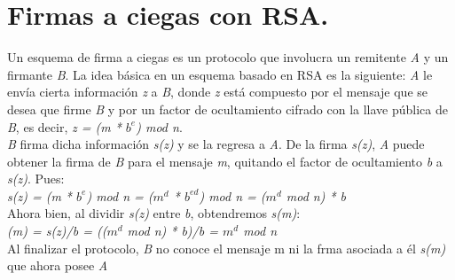 
\section{Firmas a ciegas con RSA. }

Un esquema de firma a ciegas es un protocolo que involucra un remitente \textit{A} y un firmante \textit{B}. La idea básica en un esquema basado en RSA es la siguiente: \textit{A} le envía cierta información \textit{z} a \textit{B}, donde \textit{z} está compuesto por el mensaje que se desea que firme \textit{B} y por un factor de ocultamiento cifrado con la llave pública de \textit{B}, es decir, \textit{z = (m *  $b^{e}$) mod n}.  \\
\textit{B} firma dicha información \textit{s(z)} y se la regresa a \textit{A}. De la firma \textit{s(z)}, \textit{A} puede obtener la firma de \textit{B} para el mensaje \textit{m}, quitando el factor de ocultamiento \textit{b} a \textit{s(z)}. Pues: \\

\textit{s(z) = (m *  $b^{e}$) mod n = ($m^{d}$ *  $b^{ed}$) mod n = ($m^{d}$ mod n) * b} \\

Ahora bien, al dividir \textit{s(z)} entre \textit{b}, obtendremos \textit{s(m)}: \\

\textit{(m) = s(z)/b = (($m^{d}$ mod n) * b)/b = $m^{d}$ mod n} \\

Al finalizar el protocolo, \textit{B} no conoce el mensaje m ni la frma asociada a él \textit{s(m)} que ahora posee \textit{A} ~\cite{ciegas} \\


